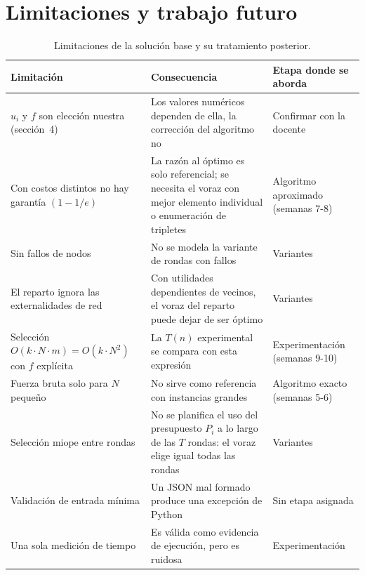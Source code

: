 \documentclass[11pt,a4paper]{article}
\begin{document}
\newpage
\section{Limitaciones y trabajo futuro}

\begin{table}[htbp]
\centering
\small
\renewcommand{\arraystretch}{1.2}
\begin{tabularx}{\textwidth}{@{}>{\raggedright\arraybackslash}p{4.8cm}>{\raggedright\arraybackslash}X>{\raggedright\arraybackslash}p{3.4cm}@{}}
\toprule
Limitación & Consecuencia & Etapa donde se aborda \\
\midrule
$u_i$ y $f$ son elección nuestra (sección~4) &
Los valores numéricos dependen de ella, la corrección del algoritmo no &
Confirmar con la docente \\
\addlinespace
Con costos distintos no hay garantía $(1-1/e)$ &
La razón al óptimo es solo referencial; se necesita el voraz con mejor elemento
individual o enumeración de tripletes &
Algoritmo aproximado (semanas 7-8) \\
\addlinespace
Sin fallos de nodos &
No se modela la variante de rondas con fallos &
Variantes \\
\addlinespace
El reparto ignora las externalidades de red &
Con utilidades dependientes de vecinos, el voraz del reparto puede dejar de ser
óptimo &
Variantes \\
\addlinespace
Selección $O(k\cdot N\cdot m)=O(k\cdot N^2)$ con $f$ explícita &
La $T(n)$ experimental se compara con esta expresión &
Experimentación (semanas 9-10) \\
\addlinespace
Fuerza bruta solo para $N$ pequeño &
No sirve como referencia con instancias grandes &
Algoritmo exacto (semanas 5-6) \\
\addlinespace
Selección miope entre rondas &
No se planifica el uso del presupuesto $P_i$ a lo largo de las $T$ rondas: el
voraz elige igual todas las rondas &
Variantes \\
\addlinespace
Validación de entrada mínima &
Un JSON mal formado produce una excepción de Python &
Sin etapa asignada \\
\addlinespace
Una sola medición de tiempo &
Es válida como evidencia de ejecución, pero es ruidosa &
Experimentación \\
\bottomrule
\end{tabularx}
\caption{Limitaciones de la solución base y su tratamiento posterior.}
\end{table}
\end{document}
